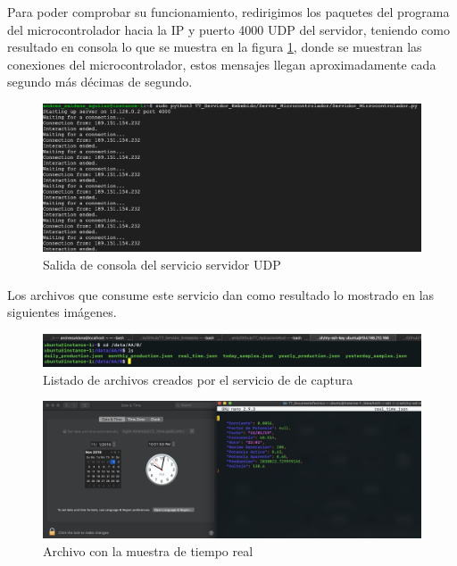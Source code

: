 Para poder comprobar su funcionamiento, redirigimos los paquetes del programa del microcontrolador hacia la IP y puerto 4000 UDP del servidor, teniendo como resultado en consola lo que se muestra en la figura \ref{fig:consola server udp}, donde se muestran las conexiones del microcontrolador, estos mensajes llegan aproximadamente cada segundo más décimas de segundo.

\begin{figure}[H]
	\centering
	\includegraphics[scale=.3]{Capitulo5/images/udp_server_console.png}
	\caption{Salida de consola del servicio servidor UDP}
	\label{fig:consola server udp}
\end{figure} 

Los archivos que consume este servicio dan como resultado lo mostrado en las siguientes imágenes.

\begin{figure}[H]
	\centering
	\includegraphics[scale=.3]{Capitulo5/images/dirlist.png}
	\caption{Listado de archivos creados por el servicio de de captura}
	\label{fig:}
\end{figure} 

\begin{figure}[H]
	\centering
	\includegraphics[scale=.25]{Capitulo5/images/real_time.png}
	\caption{Archivo con la muestra de tiempo real}
	\label{fig:}
\end{figure} 

